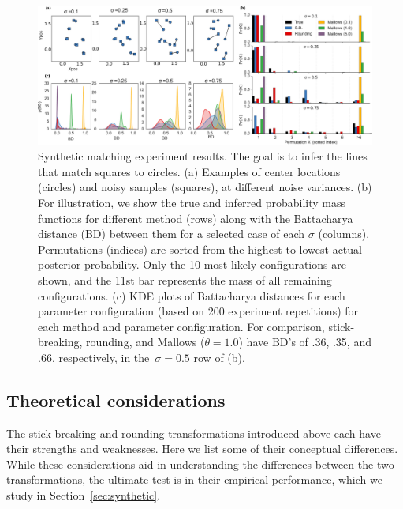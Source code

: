 \documentclass[twoside]{article}
\begin{document}
\begin{figure}[ht] 
   \centering
   \includegraphics[width=6.5in]{figure8.pdf}
   \caption{Synthetic matching experiment results. The goal is to
     infer the lines that match squares to circles. (a) Examples of
     center locations (circles) and noisy samples (squares), at
     different noise variances. (b) For illustration, we show the true
     and inferred probability mass functions for different method
     (rows) along with the Battacharya distance (BD) between them for
     a selected case of each $\sigma$ (columns). Permutations
     (indices) are sorted from the highest to lowest actual posterior
     probability. Only the 10 most likely configurations are shown,
     and the 11st bar represents the mass of all remaining
     configurations. (c) KDE plots of Battacharya distances for each
     parameter configuration (based on 200 experiment repetitions) for
     each method and parameter configuration.  For comparison,
     stick-breaking, rounding, and Mallows ($\theta = 1.0$) have BD's
     of .36, .35, and .66, respectively, in the~$\sigma = 0.5$ row of
     (b).}
   \label{fig:synthetic}
\end{figure}

\subsection{Theoretical considerations}
\label{sec:considerations}

The stick-breaking and rounding transformations introduced above each
have their strengths and weaknesses.  Here we list some of their
conceptual differences.  While these considerations aid in
understanding the differences between the two transformations, the
ultimate test is in their empirical performance, which we study in
Section~\ref{sec:synthetic}.
\end{document}
